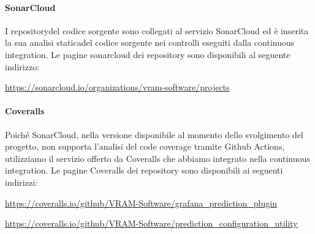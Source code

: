 		\paragraph{SonarCloud}
		I repository\glosp del codice sorgente sono collegati al servizio SonarCloud ed è inserita la sua analisi statica\glosp del codice sorgente nei controlli eseguiti dalla continuous integration. Le pagine sonarcloud dei repository sono disponibili al seguente indirizzo: 
		\begin{center}
			\url{https://sonarcloud.io/organizations/vram-software/projects}
		\end{center}
		\paragraph{Coveralls}
		Poiché SonarCloud, nella versione disponibile al momento dello svolgimento del progetto\glo, non supporta l'analisi del code coverage tramite Github Actions, utilizziamo il servizio offerto da Coveralls che abbiamo integrato nella continuous integration. Le pagine Coveralls dei repository sono disponibili ai seguenti indirizzi:
		\begin{center}
			\url{https://coveralls.io/github/VRAM-Software/grafana_prediction_plugin}
		\end{center}
		\begin{center}
		\url{https://coveralls.io/github/VRAM-Software/prediction_configuration_utility}
		\end{center}
	
		